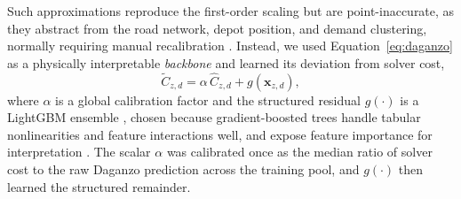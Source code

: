 \documentclass[preprint,12pt,authoryear]{elsarticle}
\begin{document}
Such approximations reproduce the first-order scaling but are point-inaccurate, as they abstract from the road network, depot position, and demand clustering, normally requiring manual recalibration \citep{Figliozzi08}. Instead, we used Equation~\eqref{eq:daganzo} as a physically interpretable \emph{backbone} and learned its deviation from solver cost,
\begin{equation}
\label{eq:surrogate}
\tilde{C}_{z,d} = \alpha\,\hat{C}_{z,d} + g(\mathbf{x}_{z,d}),
\end{equation}
where $\alpha$ is a global calibration factor and the structured residual $g(\cdot)$ is a LightGBM ensemble \citep{NIPS20176449f44a}, chosen because gradient-boosted trees handle tabular nonlinearities and feature interactions well, and expose feature importance for interpretation \citep{10.5555/3600270.3600307}. The scalar $\alpha$ was calibrated once as the median ratio of solver cost to the raw Daganzo prediction across the training pool, and $g(\cdot)$ then learned the structured remainder.
\end{document}
